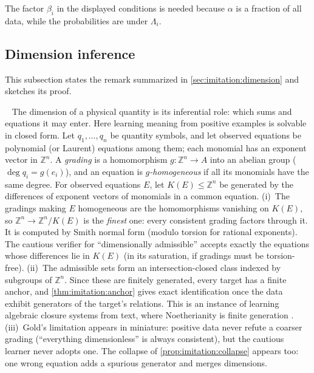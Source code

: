 The factor $\beta_i$ in the displayed conditions is needed because $\alpha$ is a fraction of all data, while the probabilities are under $\Lambda_i$.

\subsection{Dimension inference}\label{app:imitation:dimension}

This subsection states the remark summarized in \cref{sec:imitation:dimension} and sketches its proof.

\begin{remark}\ \label{rem:imitation:dimension}
The dimension of a physical quantity is its inferential role: which sums and equations it may enter. Here learning meaning from positive examples is solvable in closed form. Let $q_1,\dots,q_n$ be quantity symbols, and let observed equations be polynomial (or Laurent) equations among them; each monomial has an exponent vector in $\mathbb Z^n$. A \emph{grading} is a homomorphism $g:\mathbb Z^n\to A$ into an abelian group ($\deg q_i=g(e_i)$), and an equation is \emph{$g$-homogeneous} if all its monomials have the same degree. For observed equations $E$, let $K(E)\le\mathbb Z^n$ be generated by the differences of exponent vectors of monomials in a common equation.
(i)~The gradings making $E$ homogeneous are the homomorphisms vanishing on $K(E)$, so $\mathbb Z^n\to\mathbb Z^n/K(E)$ is the \emph{finest} one: every consistent grading factors through it. It is computed by Smith normal form (modulo torsion for rational exponents). The cautious verifier for ``dimensionally admissible'' accepts exactly the equations whose differences lie in $K(E)$ (in its saturation, if gradings must be torsion-free).
(ii)~The admissible sets form an intersection-closed class indexed by subgroups of $\mathbb Z^n$. Since these are finitely generated, every target has a finite anchor, and \cref{thm:imitation:anchor} gives exact identification once the data exhibit generators of the target's relations. This is an instance of learning algebraic closure systems from text, where Noetherianity is finite generation \citep{stephan2001learning}.
(iii)~Gold's limitation appears in miniature: positive data never refute a coarser grading (``everything dimensionless'' is always consistent), but the cautious learner never adopts one. The collapse of \cref{prop:imitation:collapse} appears too: one wrong equation adds a spurious generator and merges dimensions.

\end{remark}
